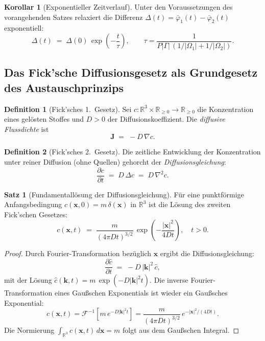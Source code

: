 ﻿\documentclass[a4paper,12pt]{article}
\theoremstyle{definition}
\newtheorem{definition}{Definition}
\newtheorem{satz}{Satz}
\newtheorem{korollar}{Korollar}
\begin{document}
\begin{korollar}[Exponentieller Zeitverlauf]
    Unter den Voraussetzungen des vorangehenden Satzes relaxiert die Differenz
    $\Delta(t) = \bar\varphi_1(t) - \bar\varphi_2(t)$ exponentiell:
    \[
        \Delta(t) \;=\; \Delta(0)\,\exp\!\left(-\frac{t}{\tau}\right),
        \qquad
        \tau = \frac{1}{P|\Gamma|\,(1/|\Omega_1| + 1/|\Omega_2|)}.
    \]
\end{korollar}

\subsection{Das Fick'sche Diffusionsgesetz als Grundgesetz des Austauschprinzips}

\begin{definition}[Fick'sches 1.\ Gesetz]
    Sei $c: \mathbb{R}^3 \times \mathbb{R}_{\geq 0} \to \mathbb{R}_{\geq 0}$ die
    Konzentration eines gelösten Stoffes und $D > 0$ der Diffusionskoeffizient.
    Die \emph{diffusive Flussdichte} ist
    \[
        \mathbf{J} \;=\; -D\,\nabla c.
    \]
\end{definition}

\begin{definition}[Fick'sches 2.\ Gesetz]
    Die zeitliche Entwicklung der Konzentration unter reiner Diffusion (ohne Quellen)
    gehorcht der \emph{Diffusionsgleichung}:
    \[
        \frac{\partial c}{\partial t} \;=\; D\,\Delta c \;=\; D\,\nabla^2 c.
    \]
\end{definition}

\begin{satz}[Fundamentallösung der Diffusionsgleichung]
    Für eine punktförmige Anfangsbedingung $c(\mathbf{x}, 0) = m\,\delta(\mathbf{x})$
    in $\mathbb{R}^3$ ist die Lösung des zweiten Fick'schen Gesetzes:
    \[
        c(\mathbf{x}, t) \;=\; \frac{m}{(4\pi D t)^{3/2}}\,
        \exp\!\left(-\frac{|\mathbf{x}|^2}{4Dt}\right), \quad t > 0.
    \]
\end{satz}

\begin{proof}
    Durch Fourier-Transformation bezüglich $\mathbf{x}$ ergibt die Diffusionsgleichung:
    \[
        \frac{\partial \hat{c}}{\partial t} \;=\; -D\,|\mathbf{k}|^2\,\hat{c},
    \]
    mit der Lösung $\hat{c}(\mathbf{k}, t) = m\,\exp(-D|\mathbf{k}|^2 t)$.
    Die inverse Fourier-Transformation eines Gaußschen Exponentials ist wieder ein
    Gaußsches Exponential:
    \[
        c(\mathbf{x}, t) = \mathcal{F}^{-1}\!\left[m\,e^{-D|\mathbf{k}|^2 t}\right]
        = \frac{m}{(4\pi Dt)^{3/2}}\,e^{-|\mathbf{x}|^2/(4Dt)}.
    \]
    Die Normierung $\int_{\mathbb{R}^3} c(\mathbf{x},t)\,d\mathbf{x} = m$ folgt aus
    dem Gaußschen Integral. \qedhere
\end{proof}
\end{document}
